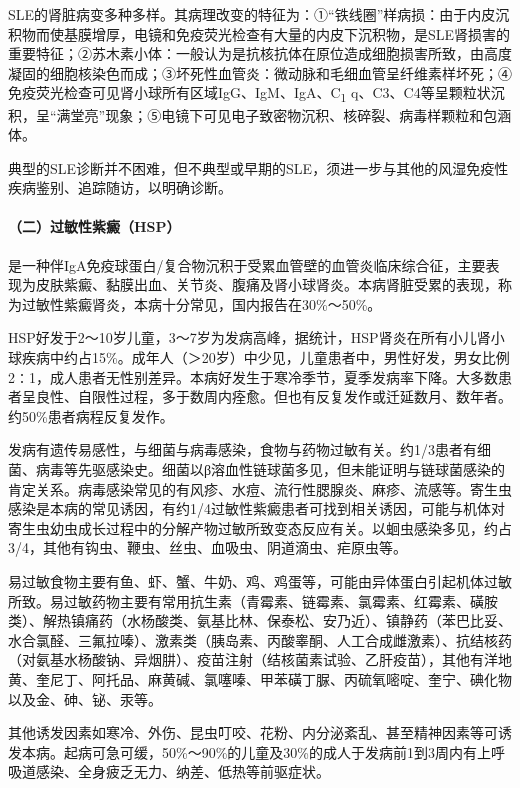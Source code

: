 SLE的肾脏病变多种多样。其病理改变的特征为：①“铁线圈”样病损：由于内皮沉积物而使基膜增厚，电镜和免疫荧光检查有大量的内皮下沉积物，是SLE肾损害的重要特征；②苏木素小体：一般认为是抗核抗体在原位造成细胞损害所致，由高度凝固的细胞核染色而成；③坏死性血管炎：微动脉和毛细血管呈纤维素样坏死；④免疫荧光检查可见肾小球所有区域IgG、IgM、IgA、C\textsubscript{1}
q、C3、C4等呈颗粒状沉积，呈“满堂亮”现象；⑤电镜下可见电子致密物沉积、核碎裂、病毒样颗粒和包涵体。

典型的SLE诊断并不困难，但不典型或早期的SLE，须进一步与其他的风湿免疫性疾病鉴别、追踪随访，以明确诊断。

\paragraph{（二）过敏性紫癜（HSP）}

是一种伴IgA免疫球蛋白/复合物沉积于受累血管壁的血管炎临床综合征，主要表现为皮肤紫癜、黏膜出血、关节炎、腹痛及肾小球肾炎。本病肾脏受累的表现，称为过敏性紫癜肾炎，本病十分常见，国内报告在30\%～50\%。

HSP好发于2～10岁儿童，3～7岁为发病高峰，据统计，HSP肾炎在所有小儿肾小球疾病中约占15\%。成年人（＞20岁）中少见，儿童患者中，男性好发，男女比例2∶1，成人患者无性别差异。本病好发生于寒冷季节，夏季发病率下降。大多数患者呈良性、自限性过程，多于数周内痊愈。但也有反复发作或迁延数月、数年者。约50\%患者病程反复发作。

发病有遗传易感性，与细菌与病毒感染，食物与药物过敏有关。约1/3患者有细菌、病毒等先驱感染史。细菌以β溶血性链球菌多见，但未能证明与链球菌感染的肯定关系。病毒感染常见的有风疹、水痘、流行性腮腺炎、麻疹、流感等。寄生虫感染是本病的常见诱因，有约1/4过敏性紫癜患者可找到相关诱因，可能与机体对寄生虫幼虫成长过程中的分解产物过敏所致变态反应有关。以蛔虫感染多见，约占3/4，其他有钩虫、鞭虫、丝虫、血吸虫、阴道滴虫、疟原虫等。

易过敏食物主要有鱼、虾、蟹、牛奶、鸡、鸡蛋等，可能由异体蛋白引起机体过敏所致。易过敏药物主要有常用抗生素（青霉素、链霉素、氯霉素、红霉素、磺胺类）、解热镇痛药（水杨酸类、氨基比林、保泰松、安乃近）、镇静药（苯巴比妥、水合氯醛、三氟拉嗪）、激素类（胰岛素、丙酸睾酮、人工合成雌激素）、抗结核药（对氨基水杨酸钠、异烟肼）、疫苗注射（结核菌素试验、乙肝疫苗），其他有洋地黄、奎尼丁、阿托品、麻黄碱、氯噻嗪、甲苯磺丁脲、丙硫氧嘧啶、奎宁、碘化物以及金、砷、铋、汞等。

其他诱发因素如寒冷、外伤、昆虫叮咬、花粉、内分泌紊乱、甚至精神因素等可诱发本病。起病可急可缓，50\%～90\%的儿童及30\%的成人于发病前1到3周内有上呼吸道感染、全身疲乏无力、纳差、低热等前驱症状。

